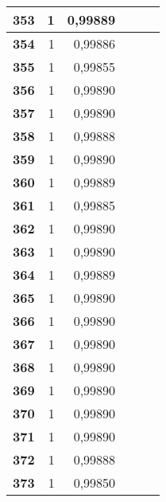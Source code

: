 \begin{longtable}{|r|r|r|l|r|r|}
\textbf{353} & 1 & 0,99889 &  & \multicolumn{1}{l|}{} & \multicolumn{1}{l|}{} \\ \hline
\textbf{354} & 1 & 0,99886 &  & \multicolumn{1}{l|}{} & \multicolumn{1}{l|}{} \\ \hline
\textbf{355} & 1 & 0,99855 &  & \multicolumn{1}{l|}{} & \multicolumn{1}{l|}{} \\ \hline
\textbf{356} & 1 & 0,99890 &  & \multicolumn{1}{l|}{} & \multicolumn{1}{l|}{} \\ \hline
\textbf{357} & 1 & 0,99890 &  & \multicolumn{1}{l|}{} & \multicolumn{1}{l|}{} \\ \hline
\textbf{358} & 1 & 0,99888 &  & \multicolumn{1}{l|}{} & \multicolumn{1}{l|}{} \\ \hline
\textbf{359} & 1 & 0,99890 &  & \multicolumn{1}{l|}{} & \multicolumn{1}{l|}{} \\ \hline
\textbf{360} & 1 & 0,99889 &  & \multicolumn{1}{l|}{} & \multicolumn{1}{l|}{} \\ \hline
\textbf{361} & 1 & 0,99885 &  & \multicolumn{1}{l|}{} & \multicolumn{1}{l|}{} \\ \hline
\textbf{362} & 1 & 0,99890 &  & \multicolumn{1}{l|}{} & \multicolumn{1}{l|}{} \\ \hline
\textbf{363} & 1 & 0,99890 &  & \multicolumn{1}{l|}{} & \multicolumn{1}{l|}{} \\ \hline
\textbf{364} & 1 & 0,99889 &  & \multicolumn{1}{l|}{} & \multicolumn{1}{l|}{} \\ \hline
\textbf{365} & 1 & 0,99890 &  & \multicolumn{1}{l|}{} & \multicolumn{1}{l|}{} \\ \hline
\textbf{366} & 1 & 0,99890 &  & \multicolumn{1}{l|}{} & \multicolumn{1}{l|}{} \\ \hline
\textbf{367} & 1 & 0,99890 &  & \multicolumn{1}{l|}{} & \multicolumn{1}{l|}{} \\ \hline
\textbf{368} & 1 & 0,99890 &  & \multicolumn{1}{l|}{} & \multicolumn{1}{l|}{} \\ \hline
\textbf{369} & 1 & 0,99890 &  & \multicolumn{1}{l|}{} & \multicolumn{1}{l|}{} \\ \hline
\textbf{370} & 1 & 0,99890 &  & \multicolumn{1}{l|}{} & \multicolumn{1}{l|}{} \\ \hline
\textbf{371} & 1 & 0,99890 &  & \multicolumn{1}{l|}{} & \multicolumn{1}{l|}{} \\ \hline
\textbf{372} & 1 & 0,99888 &  & \multicolumn{1}{l|}{} & \multicolumn{1}{l|}{} \\ \hline
\textbf{373} & 1 & 0,99850 &  & \multicolumn{1}{l|}{} & \multicolumn{1}{l|}{} \\ \hline

\end{longtable}
